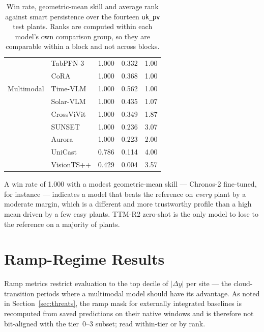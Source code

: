 \begin{table}[h!]
\begin{tabular}{l l c c c}
           & TabPFN-3 & 1.000 & 0.332 & 1.00 \\
           & CoRA & 1.000 & 0.368 & 1.00 \\
\hline
Multimodal & Time-VLM & 1.000 & 0.562 & 1.00 \\
           & Solar-VLM & 1.000 & 0.435 & 1.07 \\
           & CrossViVit & 1.000 & 0.349 & 1.87 \\
           & SUNSET & 1.000 & 0.236 & 3.07 \\
           & Aurora & 1.000 & 0.223 & 2.00 \\
           & UniCast & 0.786 & 0.114 & 4.00 \\
           & VisionTS++ & 0.429 & 0.004 & 3.57 \\
\hline
\end{tabular}
\caption{Win rate, geometric-mean skill and average rank against smart persistence over the
fourteen \texttt{uk\_pv} test plants. Ranks are computed within each model's own comparison
group, so they are comparable within a block and not across blocks.}
\label{tab:aggregation}
\end{table}

A win rate of 1.000 with a modest geometric-mean skill --- Chronos-2 fine-tuned, for
instance --- indicates a model that beats the reference on \emph{every} plant by a moderate
margin, which is a different and more trustworthy profile than a high mean driven by a few
easy plants. TTM-R2 zero-shot is the only model to lose to the reference on a majority of
plants.


\chapter{Ramp-Regime Results}
\label{app:ramp}

Ramp metrics restrict evaluation to the top decile of $|\Delta y|$ per site --- the
cloud-transition periods where a multimodal model should have its advantage. As noted in
Section~\ref{sec:threats}, the ramp mask for externally integrated baselines is recomputed
from saved predictions on their native windows and is therefore not bit-aligned with the
tier~0--3 subset; read within-tier or by rank.

